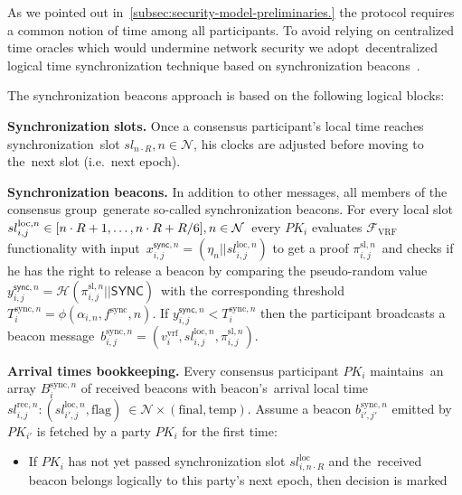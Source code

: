 As we pointed out in~\ref{subsec:security-model-preliminaries.} the protocol requires a common notion of time among all participants.
To avoid relying on centralized time oracles which would undermine network security we adopt\
decentralized logical time synchronization technique based on synchronization beacons~\cite{cryptoeprint:2019/838}.

The synchronization beacons approach is based on the following logical blocks:
\begin{legal}
    \item[]\textbf{Synchronization slots.} Once a consensus participant’s local time reaches synchronization\
    slot ${sl_{n \cdot R}, n \in \mathcal{N}}$, his clocks are adjusted before moving to the\
    next slot (i.e.\ next epoch).
    \item[]\textbf{Synchronization beacons.} In addition to other messages, all members of the consensus group\
    generate so-called synchronization beacons.
    For every local slot $sl_{i, j}^{\text{loc}, n} \in [n \cdot R + 1,\dots,n \cdot R + R \// 6], n \in \mathcal{N}$\
    every $PK_i$ evaluates $\mathcal{F}_{\text{VRF}}$ functionality with input\
    ${x_{i, j}^{\textsf{sync}, n} = (\eta_n || sl_{i, j}^{\text{loc}, n})}$ to get a proof $\pi_{i, j}^{\text{sl}, n}$\
    and checks if he has the right to release a beacon by comparing the pseudo-random value\
    ${y_{i, j}^{\textsf{sync}, n} = \mathcal{H}(\pi_{i, j}^{\text{sl}, n} || \textsf{SYNC})}$\
    with the corresponding threshold $T_{i}^{\text{sync}, n} = \phi(\alpha_{i, n}, f^{\text{sync}}, n)$.
    If ${y_{i, j}^{\textsf{sync}, n} < T_{i}^{\text{sync}, n}}$ then the participant broadcasts a beacon message\
    $b_{i, j}^{\text{sync}, n} = (v^{\text{vrf}}_i, sl_{i, j}^{\text{loc}, n}, \pi_{i, j}^{\text{sl}, n})$.
    \item[]\textbf{Arrival times bookkeeping.} Every consensus participant $PK_i$ maintains\
    an array $B_i^{\text{sync}, n}$ of received beacons with beacon's\
    arrival local time ${sl^{\text{rec}, n}_{i, j}: (sl_{i', j}^{\text{loc}, n}, \text{flag})\
    \in \mathcal{N} \times (\text{final}, \text{temp})}$.
    Assume a beacon $b_{i', j'}^{\text{sync}, n}$ emitted by $PK_{i'}$ is fetched by a party $PK_i$ for the first time:
    \begin{itemize}
        \item If $PK_i$ has not yet passed synchronization slot $sl_{i, n \cdot R}^{\text{loc}}$ and the\
        received beacon belongs logically to this party’s next epoch, then decision is marked\

\end{itemize}
\end{legal}

